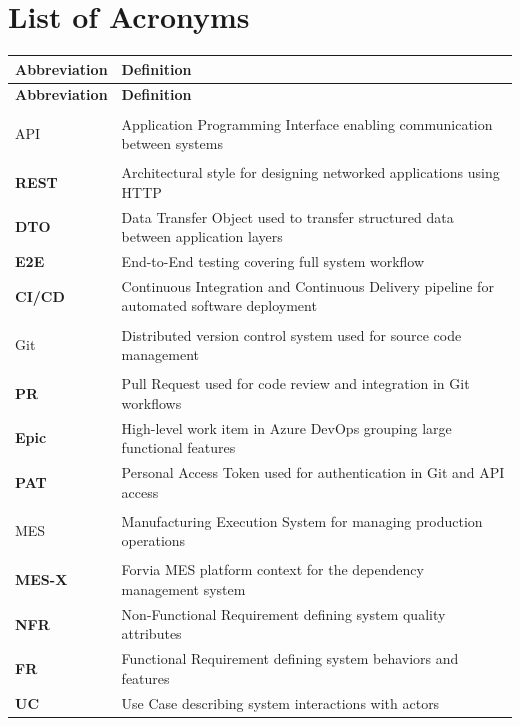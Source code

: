 \chapter*{List of Acronyms}

\vspace{0.5cm}
\begingroup
\small
\renewcommand{\arraystretch}{1.25}

\begin{longtable}{|>{\bfseries\color{primary}}p{3.0cm}|p{10.4cm}|}

\hline
\textbf{Abbreviation} & \textbf{Definition} \\
\hline
\endfirsthead

\hline
\textbf{Abbreviation} & \textbf{Definition} \\
\hline
\endhead

API        & Application Programming Interface enabling communication between systems \\
\hline
REST       & Architectural style for designing networked applications using HTTP \\
\hline
DTO        & Data Transfer Object used to transfer structured data between application layers \\
\hline
E2E        & End-to-End testing covering full system workflow \\
\hline
CI/CD      & Continuous Integration and Continuous Delivery pipeline for automated software deployment \\
\hline

Git        & Distributed version control system used for source code management \\
\hline
PR         & Pull Request used for code review and integration in Git workflows \\
\hline
Epic       & High-level work item in Azure DevOps grouping large functional features \\
\hline
PAT        & Personal Access Token used for authentication in Git and API access \\
\hline

MES        & Manufacturing Execution System for managing production operations \\
\hline
MES-X      & Forvia MES platform context for the dependency management system \\
\hline
NFR        & Non-Functional Requirement defining system quality attributes \\
\hline
FR         & Functional Requirement defining system behaviors and features \\
\hline
UC         & Use Case describing system interactions with actors \\
\hline


\end{longtable}
